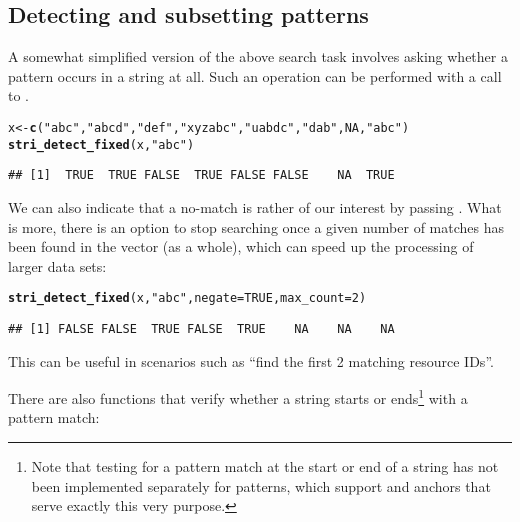 \documentclass[nojss]{jss}\usepackage[]{graphicx}\usepackage[]{xcolor}
\makeatletter
\newcommand{\hlnum}[1]{\textcolor[rgb]{0.686,0.059,0.569}{#1}}%
\newcommand{\hlstr}[1]{\textcolor[rgb]{0.192,0.494,0.8}{#1}}%
\newcommand{\hlstd}[1]{\textcolor[rgb]{0.345,0.345,0.345}{#1}}%
\newcommand{\hlkwb}[1]{\textcolor[rgb]{0.69,0.353,0.396}{#1}}%
\newcommand{\hlkwc}[1]{\textcolor[rgb]{0.333,0.667,0.333}{#1}}%
\newcommand{\hlkwd}[1]{\textcolor[rgb]{0.737,0.353,0.396}{\textbf{#1}}}%
\newenvironment{kframe}{%
 \def\at@end@of@kframe{}%
 \ifinner\ifhmode%
  \def\at@end@of@kframe{\end{minipage}}%
  \begin{minipage}{\columnwidth}%
 \fi\fi%
 \def\FrameCommand##1{\hskip\@totalleftmargin \hskip-\fboxsep
 \colorbox{shadecolor}{##1}\hskip-\fboxsep
     \hskip-\linewidth \hskip-\@totalleftmargin \hskip\columnwidth}%
 \MakeFramed {\advance\hsize-\width
   \@totalleftmargin\z@ \linewidth\hsize
   \@setminipage}}%
 {\par\unskip\endMakeFramed%
 \at@end@of@kframe}
\newenvironment{knitrout}{}{} %
\makeatother
\begin{document}
\subsection{Detecting and subsetting patterns}

A somewhat simplified version of the above search task involves asking
whether a pattern occurs in a string at all. Such an operation can be
performed with a call to .

\begin{knitrout}
\color{fgcolor}\begin{kframe}
\begin{alltt}
\hlstd{x} \hlkwb{<-} \hlkwd{c}\hlstd{(}\hlstr{"abc"}\hlstd{,} \hlstr{"abcd"}\hlstd{,} \hlstr{"def"}\hlstd{,} \hlstr{"xyzabc"}\hlstd{,} \hlstr{"uabdc"}\hlstd{,} \hlstr{"dab"}\hlstd{,} \hlnum{NA}\hlstd{,} \hlstr{"abc"}\hlstd{)}
\hlkwd{stri_detect_fixed}\hlstd{(x,} \hlstr{"abc"}\hlstd{)}
\end{alltt}
\begin{verbatim}
## [1]  TRUE  TRUE FALSE  TRUE FALSE FALSE    NA  TRUE
\end{verbatim}
\end{kframe}
\end{knitrout}

We can also indicate that a no-match is rather of our  interest
by passing .
What is more, there is an option to stop searching
once a given number of matches has been found
in the  vector (as a whole),
which can speed up the processing of larger data sets:

\begin{knitrout}
\color{fgcolor}\begin{kframe}
\begin{alltt}
\hlkwd{stri_detect_fixed}\hlstd{(x,} \hlstr{"abc"}\hlstd{,} \hlkwc{negate}\hlstd{=}\hlnum{TRUE}\hlstd{,} \hlkwc{max_count}\hlstd{=}\hlnum{2}\hlstd{)}
\end{alltt}
\begin{verbatim}
## [1] FALSE FALSE  TRUE FALSE  TRUE    NA    NA    NA
\end{verbatim}
\end{kframe}
\end{knitrout}

\noindent
This can be useful in scenarios such as ``find the first 2 matching
resource IDs''.


\medskip
There are also functions that verify whether a string
starts or ends\footnote{Note that testing for a pattern match at the start
or end of a string has not been implemented separately for  patterns,
which support  and  anchors that  serve exactly this very purpose.}
with a pattern match:
\end{document}

